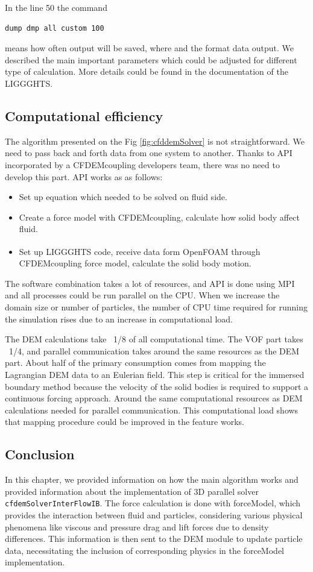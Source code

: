 In the line 50 the command 
\begin{verbatim}
dump dmp all custom 100
\end{verbatim}
means how often output will be saved, where and the format data output.
We described the main important parameters which could be adjusted for different type of calculation. More details could be found in the documentation of the LIGGGHTS.


\subsection{Computational efficiency}
The algorithm presented on the Fig \ref{fig:cfddemSolver} is not straightforward. We need to pass back and forth data from one system to another. Thanks to API incorporated by a CFDEMcoupling developers team, there was no need to develop this part. API works as as follows: 
\begin{itemize}
    \item Set up equation which needed to be solved on fluid side.
    \item Create a force model with CFDEMcoupling, calculate how solid body affect fluid.
    \item Set up LIGGGHTS\textsuperscript{\textregistered} code, receive data form OpenFOAM\textsuperscript{\textregistered} through CFDEMcoupling force model, calculate the solid body motion.
\end{itemize}

The software combination takes a lot of resources, and API is done using MPI and all processes could be run parallel on the CPU. When we increase the domain size or number of particles, the number of CPU time required for running the simulation rises due to an increase in computational load.

The DEM calculations take ~1/8 of all computational time. The VOF part takes ~1/4, and parallel communication takes around the same resources as the DEM part. About half of the primary consumption comes from mapping the Lagrangian DEM data to an Eulerian field. This step is critical for the immersed boundary method because the velocity of the solid bodies is required to support a continuous forcing approach. Around the same computational resources as DEM calculations needed for parallel communication. This computational load shows that mapping procedure could be improved in the feature works.

\subsection{Conclusion}
In this chapter, we provided information on how the main algorithm works and provided information about the implementation of 3D parallel solver \verb|cfdemSolverInterFlowIB|. The force calculation is done with forceModel, which provides the interaction between fluid and particles, considering various physical phenomena like viscous and pressure drag and lift forces due to density differences. This information is then sent to the DEM module to update particle data, necessitating the inclusion of corresponding physics in the forceModel implementation.

